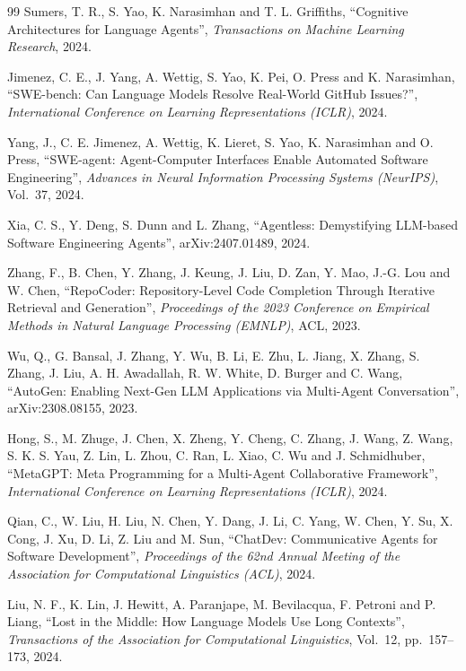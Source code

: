 \begin{thebibliography}{99}
 Sumers, T. R., S. Yao, K. Narasimhan and T. L. Griffiths, ``Cognitive Architectures for Language Agents'', \emph{Transactions on Machine Learning Research}, 2024.

 Jimenez, C. E., J. Yang, A. Wettig, S. Yao, K. Pei, O. Press and K. Narasimhan, ``SWE-bench: Can Language Models Resolve Real-World GitHub Issues?'', \emph{International Conference on Learning Representations (ICLR)}, 2024.

 Yang, J., C. E. Jimenez, A. Wettig, K. Lieret, S. Yao, K. Narasimhan and O. Press, ``SWE-agent: Agent-Computer Interfaces Enable Automated Software Engineering'', \emph{Advances in Neural Information Processing Systems (NeurIPS)}, Vol.~37, 2024.

 Xia, C. S., Y. Deng, S. Dunn and L. Zhang, ``Agentless: Demystifying LLM-based Software Engineering Agents'', arXiv:2407.01489, 2024.

 Zhang, F., B. Chen, Y. Zhang, J. Keung, J. Liu, D. Zan, Y. Mao, J.-G. Lou and W. Chen, ``RepoCoder: Repository-Level Code Completion Through Iterative Retrieval and Generation'', \emph{Proceedings of the 2023 Conference on Empirical Methods in Natural Language Processing (EMNLP)}, ACL, 2023.

 Wu, Q., G. Bansal, J. Zhang, Y. Wu, B. Li, E. Zhu, L. Jiang, X. Zhang, S. Zhang, J. Liu, A. H. Awadallah, R. W. White, D. Burger and C. Wang, ``AutoGen: Enabling Next-Gen LLM Applications via Multi-Agent Conversation'', arXiv:2308.08155, 2023.

 Hong, S., M. Zhuge, J. Chen, X. Zheng, Y. Cheng, C. Zhang, J. Wang, Z. Wang, S. K. S. Yau, Z. Lin, L. Zhou, C. Ran, L. Xiao, C. Wu and J. Schmidhuber, ``MetaGPT: Meta Programming for a Multi-Agent Collaborative Framework'', \emph{International Conference on Learning Representations (ICLR)}, 2024.

 Qian, C., W. Liu, H. Liu, N. Chen, Y. Dang, J. Li, C. Yang, W. Chen, Y. Su, X. Cong, J. Xu, D. Li, Z. Liu and M. Sun, ``ChatDev: Communicative Agents for Software Development'', \emph{Proceedings of the 62nd Annual Meeting of the Association for Computational Linguistics (ACL)}, 2024.

 Liu, N. F., K. Lin, J. Hewitt, A. Paranjape, M. Bevilacqua, F. Petroni and P. Liang, ``Lost in the Middle: How Language Models Use Long Contexts'', \emph{Transactions of the Association for Computational Linguistics}, Vol.~12, pp.~157--173, 2024.


\end{thebibliography}
